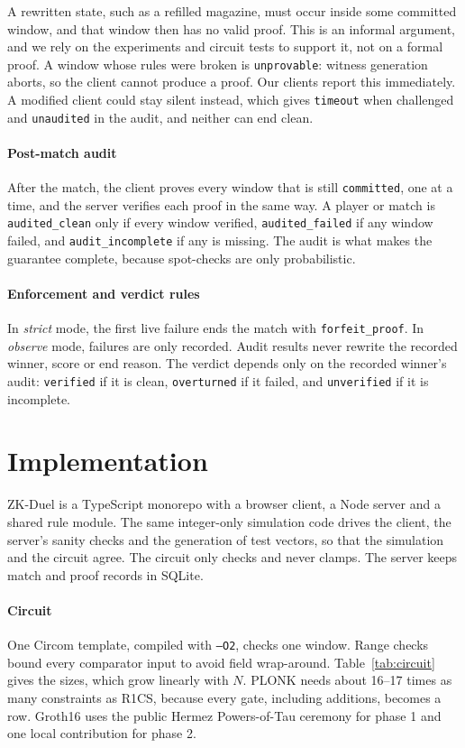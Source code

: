 \documentclass[conference]{IEEEtran}
\newcommand{\status}[1]{\texttt{#1}}
\begin{document}
A rewritten state, such as a refilled magazine, must occur inside some committed window, and that window then has no valid proof.
This is an informal argument, and we rely on the experiments and circuit tests to support it, not on a formal proof.
A window whose rules were broken is \status{unprovable}: witness generation aborts, so the client cannot produce a proof.
Our clients report this immediately.
A modified client could stay silent instead, which gives \status{timeout} when challenged and \status{unaudited} in the audit, and neither can end clean.

\paragraph*{Post-match audit}
After the match, the client proves every window that is still \status{committed}, one at a time, and the server verifies each proof in the same way.
A player or match is \status{audited\_clean} only if every window verified, \status{audited\_failed} if any window failed, and \status{audit\_incomplete} if any is missing.
The audit is what makes the guarantee complete, because spot-checks are only probabilistic.

\paragraph*{Enforcement and verdict rules}
In \emph{strict} mode, the first live failure ends the match with \status{forfeit\_proof}.
In \emph{observe} mode, failures are only recorded.
Audit results never rewrite the recorded winner, score or end reason.
The verdict depends only on the recorded winner's audit: \status{verified} if it is clean, \status{overturned} if it failed, and \status{unverified} if it is incomplete.

\section{Implementation}

ZK-Duel is a TypeScript monorepo with a browser client, a Node server and a shared rule module.
The same integer-only simulation code drives the client, the server's sanity checks and the generation of test vectors, so that the simulation and the circuit agree.
The circuit only checks and never clamps.
The server keeps match and proof records in SQLite.

\paragraph*{Circuit}
One Circom template, compiled with \texttt{--O2}, checks one window. %
Range checks bound every comparator input to avoid field wrap-around.
Table~\ref{tab:circuit} gives the sizes, which grow linearly with $N$.
PLONK needs about 16--17 times as many constraints as R1CS, because every gate, including additions, becomes a row. %
Groth16 uses the public Hermez Powers-of-Tau ceremony for phase 1 and one local contribution for phase 2. %
\end{document}
